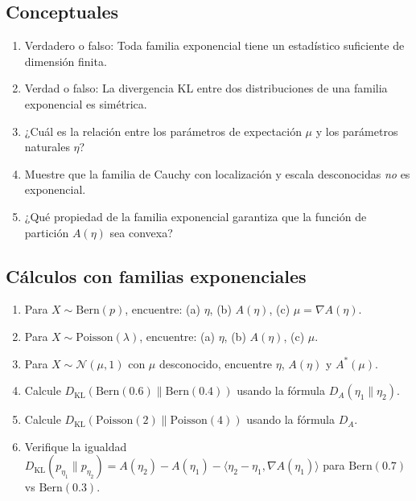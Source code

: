 \subsection*{Conceptuales}
\begin{enumerate}
	\item[$\star$] Verdadero o falso: Toda familia exponencial tiene un estadístico suficiente de dimensión finita.
	\item[$\star$] Verdad o falso: La divergencia KL entre dos distribuciones de una familia exponencial es simétrica.
	\item[$\star$] ¿Cuál es la relación entre los parámetros de expectación $\mu$ y los parámetros naturales $\eta$?
	\item[$\star\star\star$] Muestre que la familia de Cauchy con localización y escala desconocidas \emph{no} es exponencial.
	\item[$\star$] ¿Qué propiedad de la familia exponencial garantiza que la función de partición $A(\eta)$ sea convexa?
\end{enumerate}

\subsection*{Cálculos con familias exponenciales}
\begin{enumerate}[resume]
	\item[$\star$] Para $X \sim \mathrm{Bern}(p)$, encuentre: (a) $\eta$, (b) $A(\eta)$, (c) $\mu = \nabla A(\eta)$.
	\item[$\star$] Para $X \sim \mathrm{Poisson}(\lambda)$, encuentre: (a) $\eta$, (b) $A(\eta)$, (c) $\mu$.
	\item[$\star\star$] Para $X \sim \mathcal{N}(\mu, 1)$ con $\mu$ desconocido, encuentre $\eta$, $A(\eta)$ y $A^*(\mu)$.
	\item[$\star\star$] Calcule $D_{\mathrm{KL}}(\mathrm{Bern}(0.6) \| \mathrm{Bern}(0.4))$ usando la fórmula $D_A(\eta_1 \| \eta_2)$.
	\item[$\star\star$] Calcule $D_{\mathrm{KL}}(\mathrm{Poisson}(2) \| \mathrm{Poisson}(4))$ usando la fórmula $D_A$.
	\item[$\star\star\star$] Verifique la igualdad $D_{\mathrm{KL}}(p_{\eta_1} \| p_{\eta_2}) = A(\eta_2) - A(\eta_1) - \langle \eta_2 - \eta_1, \nabla A(\eta_1) \rangle$ para $\mathrm{Bern}(0.7)$ vs $\mathrm{Bern}(0.3)$.
\end{enumerate}

